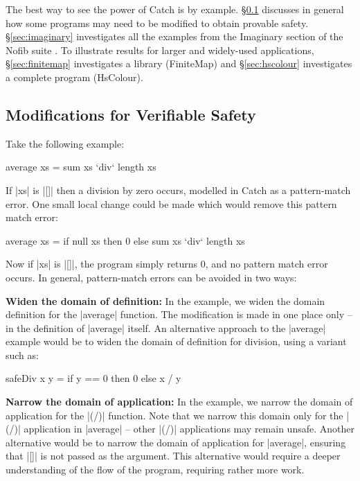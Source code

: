 \documentclass[preprint]{sigplanconf}
\newcommand{\para}[1]{\vspace{2mm}\noindent\textbf{#1}}
\begin{document}
The best way to see the power of Catch is by example. \S\ref{sec:safety} discusses in general how some programs may need to be modified to obtain provable safety. \S\ref{sec:imaginary} investigates all the examples from the Imaginary section of the Nofib suite \cite{nofib}. To illustrate results for larger and widely-used applications, \S\ref{sec:finitemap} investigates a library (FiniteMap) and \S\ref{sec:hscolour} investigates a complete program (HsColour).


\subsection{Modifications for Verifiable Safety}
\label{sec:safety}

Take the following example:

\begin{code}
average xs = sum xs `div` length xs
\end{code}

If |xs| is |[]| then a division by zero occurs, modelled in Catch as a pattern-match error. One small local change could be made which would remove this pattern match error:

\begin{code}
average xs = if null xs then 0 else sum xs `div` length xs
\end{code}

\noindent Now if |xs| is |[]|, the program simply returns 0, and no pattern match error occurs. In general, pattern-match errors can be avoided in two ways:

\para{Widen the domain of definition:} In the example, we widen the domain definition for the |average| function. The modification is made in one place only -- in the definition of |average| itself. An alternative approach to the |average| example would be to widen the domain of definition for division, using a variant such as:

\begin{code}
safeDiv x y = if y == 0 then 0 else x / y
\end{code}


\para{Narrow the domain of application:} In the example, we narrow the domain of application for the |(/)| function.  Note that we narrow this domain only for the |(/)| application in |average| -- other |(/)| applications may remain unsafe. Another alternative would be to narrow the domain of application for |average|, ensuring that |[]| is not passed as the argument. This alternative would require a deeper understanding of the flow of the program, requiring rather more work.
\end{document}

